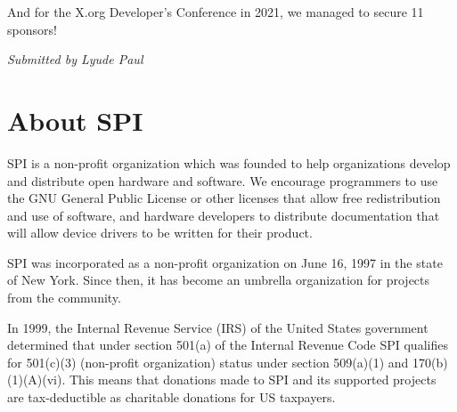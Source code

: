 \documentclass[a4paper]{report}
\begin{document}
And for the X.org Developer's Conference in 2021, we managed to secure 11 sponsors!

{\em Submitted by Lyude Paul}


\appendix
\chapter{About SPI}

SPI is a non-profit organization which was founded to help organizations develop and distribute open hardware and software. We encourage programmers to use the GNU General Public License or other licenses that allow free redistribution and use of software, and hardware developers to distribute documentation that will allow device drivers to be written for their product.

SPI was incorporated as a non-profit organization on June 16, 1997 in the state of New York. Since then, it has become an umbrella organization for projects from the community.

In 1999, the Internal Revenue Service (IRS) of the United States government determined that under section 501(a) of the Internal Revenue Code SPI qualifies for 501(c)(3) (non-profit organization) status under section 509(a)(1) and 170(b)(1)(A)(vi). This means that donations made to SPI and its supported projects are tax-deductible as charitable donations for US taxpayers.

\newpage

\pagestyle{empty}


\null
\end{document}
